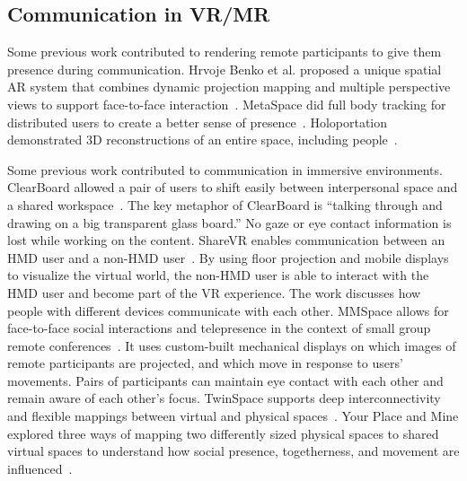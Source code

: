\documentclass[chi_draft]{sigchi}
\begin{document}
\subsection{Communication in VR/MR}
Some previous work contributed to rendering remote participants to give them presence during communication. Hrvoje Benko et al. proposed a unique spatial AR system that combines dynamic projection mapping and multiple perspective views to support face-to-face interaction~\cite{benko2014dyadic}. MetaSpace did full body tracking for distributed users to create a better sense of presence~\cite{sra2015metaspace}. Holoportation demonstrated 3D reconstructions of an entire space, including people~\cite{orts2016holoportation}. 

Some previous work contributed to communication in immersive environments. ClearBoard allowed a pair of users to shift easily between interpersonal space and a shared workspace~\cite{ishii1993integration}.
The key metaphor of ClearBoard is ``talking through and drawing on a big transparent glass board.'' No gaze or eye contact information is lost while working on the content. ShareVR enables communication between an HMD user and a non-HMD user~\cite{gugenheimer2017sharevr}. By using floor projection and mobile displays to visualize the virtual world, the non-HMD user is able to interact with the HMD user and become part of the VR experience. The work discusses how people with different devices communicate with each other. MMSpace allows for face-to-face social interactions and telepresence in the context of small group remote conferences~\cite{otsuka2016mmspace}. It uses custom-built mechanical displays on which images of remote participants are projected, and which move in response to users' movements. Pairs of participants can maintain eye contact with each other and remain aware of each other's focus. 
TwinSpace supports deep interconnectivity and flexible mappings between virtual and physical spaces~\cite{reilly2010twinspace}.
Your Place and Mine explored three ways of mapping two differently sized
physical spaces to shared virtual spaces to understand how social presence, togetherness, and movement are influenced~\cite{sra2018}.

\end{document}

